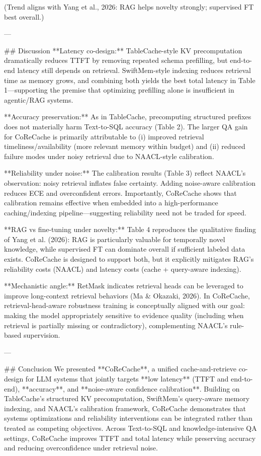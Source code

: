 (Trend aligns with Yang et al., 2026: RAG helps novelty strongly; supervised FT best overall.)

---

## Discussion  
**Latency co-design:** TableCache-style KV precomputation dramatically reduces TTFT by removing repeated schema prefilling, but end-to-end latency still depends on retrieval. SwiftMem-style indexing reduces retrieval time as memory grows, and combining both yields the best total latency in Table 1—supporting the premise that optimizing prefilling alone is insufficient in agentic/RAG systems.

**Accuracy preservation:** As in TableCache, precomputing structured prefixes does not materially harm Text-to-SQL accuracy (Table 2). The larger QA gain for CoReCache is primarily attributable to (i) improved retrieval timeliness/availability (more relevant memory within budget) and (ii) reduced failure modes under noisy retrieval due to NAACL-style calibration.

**Reliability under noise:** The calibration results (Table 3) reflect NAACL’s observation: noisy retrieval inflates false certainty. Adding noise-aware calibration reduces ECE and overconfident errors. Importantly, CoReCache shows that calibration remains effective when embedded into a high-performance caching/indexing pipeline—suggesting reliability need not be traded for speed.

**RAG vs fine-tuning under novelty:** Table 4 reproduces the qualitative finding of Yang et al. (2026): RAG is particularly valuable for temporally novel knowledge, while supervised FT can dominate overall if sufficient labeled data exists. CoReCache is designed to support both, but it explicitly mitigates RAG’s reliability costs (NAACL) and latency costs (cache + query-aware indexing).

**Mechanistic angle:** RetMask indicates retrieval heads can be leveraged to improve long-context retrieval behaviors (Ma & Okazaki, 2026). In CoReCache, retrieval-head-aware robustness training is conceptually aligned with our goal: making the model appropriately sensitive to evidence quality (including when retrieval is partially missing or contradictory), complementing NAACL’s rule-based supervision.

---

## Conclusion  
We presented **CoReCache**, a unified cache-and-retrieve co-design for LLM systems that jointly targets **low latency** (TTFT and end-to-end), **accuracy**, and **noise-aware confidence calibration**. Building on TableCache’s structured KV precomputation, SwiftMem’s query-aware memory indexing, and NAACL’s calibration framework, CoReCache demonstrates that systems optimizations and reliability interventions can be integrated rather than treated as competing objectives. Across Text-to-SQL and knowledge-intensive QA settings, CoReCache improves TTFT and total latency while preserving accuracy and reducing overconfidence under retrieval noise.

